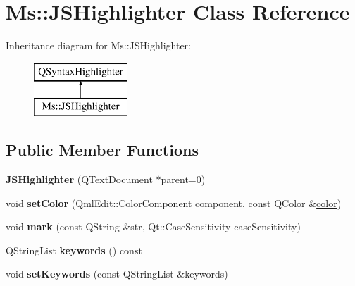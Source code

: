 \hypertarget{class_ms_1_1_j_s_highlighter}{}\section{Ms\+:\+:J\+S\+Highlighter Class Reference}
\label{class_ms_1_1_j_s_highlighter}
Inheritance diagram for Ms\+:\+:J\+S\+Highlighter\+:\begin{figure}[H]
\begin{center}
\leavevmode
\includegraphics[height=2.000000cm]{class_ms_1_1_j_s_highlighter}
\end{center}
\end{figure}
\subsection*{Public Member Functions}
\begin{DoxyCompactItemize}
\item 
\mbox{\label{class_ms_1_1_j_s_highlighter_ad3de164a93aa9bfc0bb84e2554cbfc8c}} 
{\bfseries J\+S\+Highlighter} (Q\+Text\+Document $\ast$parent=0)
\item 
\mbox{\label{class_ms_1_1_j_s_highlighter_a02e3f1a750c91fb67153ca937bbc8e99}} 
void {\bfseries set\+Color} (Qml\+Edit\+::\+Color\+Component component, const Q\+Color \&\hyperlink{structcolor}{color})
\item 
\mbox{\label{class_ms_1_1_j_s_highlighter_ae57d06738087a2634ea18dc30d0939fb}} 
void {\bfseries mark} (const Q\+String \&str, Qt\+::\+Case\+Sensitivity case\+Sensitivity)
\item 
\mbox{\label{class_ms_1_1_j_s_highlighter_a02073625d0a17568b1074979591f9e10}} 
Q\+String\+List {\bfseries keywords} () const
\item 
\mbox{\label{class_ms_1_1_j_s_highlighter_a9c692f69201eccb341cb58ec88e2fe27}} 
void {\bfseries set\+Keywords} (const Q\+String\+List \&keywords)
\end{DoxyCompactItemize}
